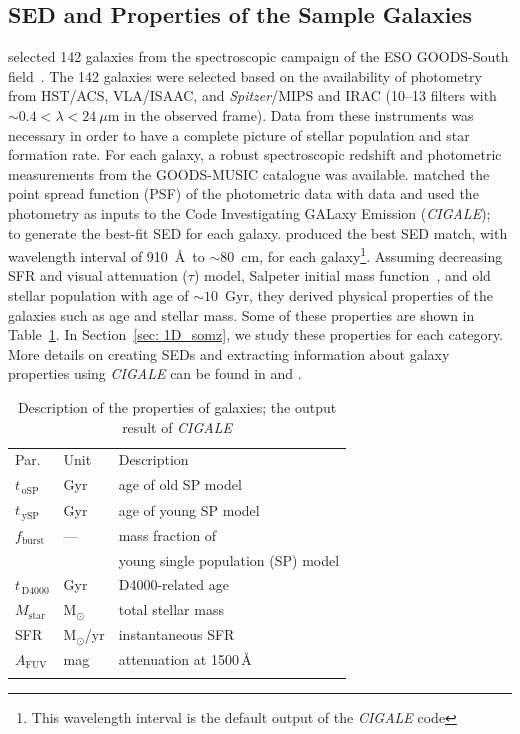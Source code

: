  \subsection{SED and Properties of the Sample Galaxies} 
     selected 142 galaxies from the spectroscopic campaign of the ESO GOODS-South field~\citep{Vanzella05, Vanzella06, Vanzella08}.
    The 142 galaxies were selected based on the availability of photometry from HST/ACS, VLA/ISAAC, and {\it Spitzer}/MIPS and IRAC (10--13 filters with $\sim 0.4<\lambda<24~\mu$m in the observed frame).
   Data from these instruments was necessary in order to have a complete picture of stellar population and star formation rate. 
    For each galaxy, a robust spectroscopic redshift and photometric measurements from the GOODS-MUSIC catalogue \citep{Santini09} was available.
    matched the point spread function (PSF) of the photometric data with  data and used the photometry as inputs to the Code Investigating GALaxy Emission ({\em CIGALE});~\citep[][hereafter N09]{Noll09} to generate the best-fit SED for each galaxy.
     produced the best SED match, with wavelength interval of 910~\AA~to $\sim 80$~cm, for each galaxy\footnote{This wavelength interval is the default output of the {\em CIGALE} code}.
    Assuming decreasing SFR and visual attenuation ($\tau$) model, Salpeter initial mass function~\citep{Salpeter55}, and old stellar population with age of $\sim 10$~Gyr, they derived physical properties of the galaxies such as age and stellar mass.
    Some of these properties are shown in Table~\ref{tab: props}.
    In Section~\ref{sec: 1D_somz}, we study these properties for each category.
    More details on creating SEDs and extracting information about galaxy properties using {\em CIGALE} can be found in  and .
    
       
\begin{table}
\caption[Description of the properties of \citet{Hossein12} galaxies]{Description of the properties of \citet{Hossein12} galaxies; the output result of {\em CIGALE}}     
\label{tab: props}
\centering
\begin{tabular}{l l l}
\hline\hline
\noalign{\smallskip}
Par. & Unit & Description\\
\noalign{\smallskip}
\hline
\noalign{\smallskip}
$t_{\,\mathrm{oSP}}$ & Gyr & age of old SP model \\
$t_{\,\mathrm{ySP}}$ & Gyr & age of young SP model \\
$f_\mathrm{burst}$ & --- & mass fraction of \\
& & young single population (SP) model \\
\noalign{\smallskip}
$t_{\,\mathrm{D4000}}$ & Gyr & D4000-related age \\
\noalign{\smallskip}
$M_\mathrm{star}$ & M$_\odot$ & total stellar mass  \\
SFR & M$_\odot$/yr & instantaneous SFR  \\
$A_\mathrm{FUV}$ & mag & attenuation at 1500\,\AA{} \\
\noalign{\smallskip}
\hline
\end{tabular}
\end{table}


